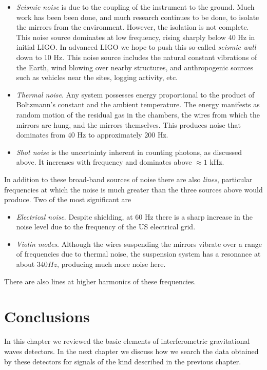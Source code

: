 \begin{itemize} 

\item \emph{Seismic noise} is due to the coupling of the
instrument to the ground.  Much work has been been done, and much
research continues to be done, to isolate the mirrors from the
environment.  However, the isolation is not complete.  This noise
source dominates at low frequency, rising sharply below 40 Hz in
initial LIGO.  In advanced LIGO we hope to push this so-called
\emph{seismic wall} down to 10 Hz.  This noise source includes the
natural constant vibrations of the Earth, wind blowing over nearby
structures, and anthropogenic sources such as vehicles near the sites,
logging activity, etc.

\item \emph{Thermal noise}. Any system possesses energy proportional to 
the product of Boltzmann's constant and the ambient temperature.  The
energy manifests as random motion of the residual gas in the chambers,
the wires from which the mirrors are hung, and the mirrors themselves.
This produces noise that dominates from 40 Hz to approximately 200 Hz.

\item \emph{Shot noise} is the uncertainty inherent in counting
photons, as discussed above.  It increases with frequency and
dominates above $\approx 1$ kHz.

\end{itemize}

In addition to these broad-band sources of noise there are also
\emph{lines}, particular frequencies at which the noise is much
greater than the three sources above would produce.  Two of the most
significant are

\begin{itemize}
\item \emph{Electrical noise}.  Despite shielding, at 60 Hz there is a
sharp increase in the noise level due to the frequency of the US
electrical grid.
\item \emph{Violin modes}.  Although the wires suspending the mirrors
vibrate over a range of frequencies due to thermal noise, the
suspension system has a resonance at about $340 Hz$, producing much
more noise here.
\end{itemize}

There are also lines at higher harmonics of these frequencies.


\section{Conclusions}

In this chapter we reviewed the basic elements of interferometric
gravitational waves detectors.  In the next chapter we discuss how we
search the data obtained by these detectors for signals of the kind
described in the previous chapter.

